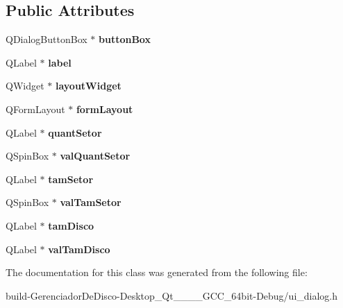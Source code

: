 \subsection*{Public Attributes}
\begin{DoxyCompactItemize}
\item 
\hypertarget{classUi__Dialog_a5991d63e5d8f30a9a29671aeb370439a}{}Q\+Dialog\+Button\+Box $\ast$ {\bfseries button\+Box}\label{classUi__Dialog_a5991d63e5d8f30a9a29671aeb370439a}

\item 
\hypertarget{classUi__Dialog_a7f0bb3c686eebfcee9c7a439fc1fe79c}{}Q\+Label $\ast$ {\bfseries label}\label{classUi__Dialog_a7f0bb3c686eebfcee9c7a439fc1fe79c}

\item 
\hypertarget{classUi__Dialog_a6d519cb52632a0216fef7bb9a429af41}{}Q\+Widget $\ast$ {\bfseries layout\+Widget}\label{classUi__Dialog_a6d519cb52632a0216fef7bb9a429af41}

\item 
\hypertarget{classUi__Dialog_a5218e699bf6de0048f2fbe5fa03a34de}{}Q\+Form\+Layout $\ast$ {\bfseries form\+Layout}\label{classUi__Dialog_a5218e699bf6de0048f2fbe5fa03a34de}

\item 
\hypertarget{classUi__Dialog_a6f921061e303332855576b1d2b9852f7}{}Q\+Label $\ast$ {\bfseries quant\+Setor}\label{classUi__Dialog_a6f921061e303332855576b1d2b9852f7}

\item 
\hypertarget{classUi__Dialog_ae1c6f4f8e9a96b614f070f3e43840c38}{}Q\+Spin\+Box $\ast$ {\bfseries val\+Quant\+Setor}\label{classUi__Dialog_ae1c6f4f8e9a96b614f070f3e43840c38}

\item 
\hypertarget{classUi__Dialog_ae605b68db90d62dbb12a846beade4880}{}Q\+Label $\ast$ {\bfseries tam\+Setor}\label{classUi__Dialog_ae605b68db90d62dbb12a846beade4880}

\item 
\hypertarget{classUi__Dialog_a2ca544457e671fea81b6656eb75a9142}{}Q\+Spin\+Box $\ast$ {\bfseries val\+Tam\+Setor}\label{classUi__Dialog_a2ca544457e671fea81b6656eb75a9142}

\item 
\hypertarget{classUi__Dialog_a457a5e3a5d2faf1fb56a5a231dca1ce4}{}Q\+Label $\ast$ {\bfseries tam\+Disco}\label{classUi__Dialog_a457a5e3a5d2faf1fb56a5a231dca1ce4}

\item 
\hypertarget{classUi__Dialog_afd9ae775d0784ce5089010610594a598}{}Q\+Label $\ast$ {\bfseries val\+Tam\+Disco}\label{classUi__Dialog_afd9ae775d0784ce5089010610594a598}

\end{DoxyCompactItemize}


The documentation for this class was generated from the following file\+:\begin{DoxyCompactItemize}
\item 
build-\/\+Gerenciador\+De\+Disco-\/\+Desktop\+\_\+\+Qt\+\_\+\_\+\_\+\_\+\+G\+C\+C\+\_\+64bit-\/\+Debug/ui\+\_\+dialog.\+h\end{DoxyCompactItemize}
